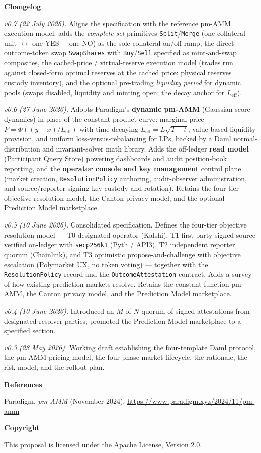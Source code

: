 \documentclass[11pt,a4paper]{article}
\begin{document}
\bigskip
\noindent\textbf{Changelog}

\smallskip
\textit{v0.7 (22 July 2026).} Aligns the specification with the reference pm-AMM execution model: adds the \emph{complete-set} primitives \texttt{Split}/\texttt{Merge} (one collateral unit $\leftrightarrow$ one YES + one NO) as the sole collateral on/off ramp, the direct outcome-token swap \texttt{SwapShares} with \texttt{Buy}/\texttt{Sell} specified as mint-and-swap composites, the cached-price / virtual-reserve execution model (trades run against closed-form optimal reserves at the cached price; physical reserves custody inventory), and the optional pre-trading \emph{liquidity period} for dynamic pools (swaps disabled, liquidity and minting open; the decay anchor for $L_{\mathrm{eff}}$).

\smallskip
\textit{v0.6 (27 June 2026).} Adopts Paradigm's \textbf{dynamic pm-AMM} (Gaussian score dynamics) in place of the constant-product curve: marginal price $P=\Phi((y-x)/L_{\mathrm{eff}})$ with time-decaying $L_{\mathrm{eff}}=L\sqrt{T-t}$, value-based liquidity provision, and uniform loss-versus-rebalancing for LPs, backed by a Daml normal-distribution and invariant-solver math library. Adds the off-ledger \textbf{read model} (Participant Query Store) powering dashboards and audit position-book reporting, and the \textbf{operator console and key management} control plane (market creation, \texttt{ResolutionPolicy} authoring, audit-observer administration, and source/reporter signing-key custody and rotation). Retains the four-tier objective resolution model, the Canton privacy model, and the optional Prediction Model marketplace.

\smallskip
\textit{v0.5 (10 June 2026).} Consolidated specification. Defines the four-tier objective resolution model --- T0 designated operator (Kalshi), T1 first-party signed source verified on-ledger with \texttt{secp256k1} (Pyth / API3), T2 independent reporter quorum (Chainlink), and T3 optimistic propose-and-challenge with objective escalation (Polymarket UX, no token voting) --- together with the \texttt{ResolutionPolicy} record and the \texttt{OutcomeAttestation} contract. Adds a survey of how existing prediction markets resolve. Retains the constant-function pm-AMM, the Canton privacy model, and the Prediction Model marketplace.

\smallskip
\textit{v0.4 (10 June 2026).} Introduced an $M$-of-$N$ quorum of signed attestations from designated resolver parties; promoted the Prediction Model marketplace to a specified section.

\smallskip
\textit{v0.3 (28 May 2026).} Working draft establishing the four-template Daml protocol, the pm-AMM pricing model, the four-phase market lifecycle, the rationale, the risk model, and the rollout plan.

\bigskip
\noindent\textbf{References}

\smallskip
\noindent Paradigm, \emph{pm-AMM} (November 2024). \url{https://www.paradigm.xyz/2024/11/pm-amm}

\bigskip
\noindent\textbf{Copyright}

This proposal is licensed under the Apache License, Version 2.0.
\end{document}
